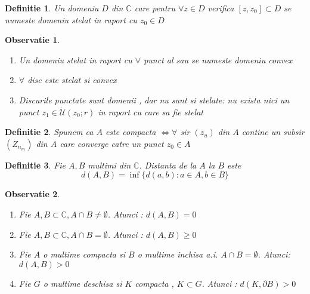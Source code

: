 \documentclass[12pt,a4paper]{article}
\newtheorem{definition}{Definitie}
\newtheorem{observation}{Observatie}
\newcommand{\C}{\ensuremath{\mathbb{C}}}
\begin{document}
\begin{definition}
	Un domeniu $D$ din $\C$ care pentru $\forall z \in D$ verifica $[z,z_0]\subset D$ se numeste domeniu stelat in raport cu $z_0 \in D$
\end{definition}

\begin{observation}\leavevmode
	\begin{enumerate}
		\item Un domeniu stelat in raport cu $\forall$ punct al sau se numeste domeniu convex
		\item $\forall$ disc este stelat si convex
		\item Discurile punctate sunt domenii , dar nu sunt si stelate: nu exista nici un punct $z_1 \in \dot{\mathcal{U}}(z_0;r)$ in raport cu care sa fie stelat
	\end{enumerate}
\end{observation}

\begin{definition}
	Spunem ca $A$ este compacta $\iff \forall$ sir $(z_u)$ din $A$ contine un subsir $(Z_{n_m})$ din $A$ care converge catre un punct $z_0 \in A$
\end{definition}

\begin{definition}
	Fie $A, B$ multimi din $\C$. Distanta de la $A$ la $B$ este
	\begin{equation}
		d(A,B) = \inf\{d(a,b)\colon a \in A , b \in B \}
	\end{equation}
\end{definition}

\begin{observation}\leavevmode
\begin{enumerate}
	\item Fie $A, B \subset \C, A \cap B \neq \emptyset$. Atunci :
	$d(A, B) = 0$
	\item Fie $A, B \subset \C, A \cap B = \emptyset$. Atunci :
	$d(A, B) \geq 0$
	\item Fie $A$ o multime compacta si $B$ o multime inchisa a.i. $A \cap B = \emptyset$. Atunci:
	$d(A, B) > 0$
	\item Fie $G$ o multime deschisa si $K$ compacta , $K\subset G$. Atunci :
	$d(K, \partial B) > 0$
\end{enumerate}


\end{observation}
\end{document}

